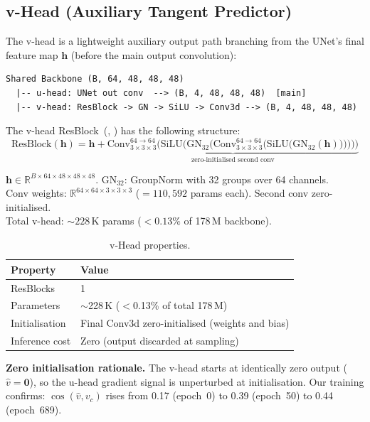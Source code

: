 \subsection{v-Head (Auxiliary Tangent Predictor)}
\label{sec:vhead_arch}

The v-head is a lightweight auxiliary output path branching from the UNet's
final feature map $\mathbf{h}$ (before the main output convolution):
\begin{center}
\begin{BVerbatim}
Shared Backbone (B, 64, 48, 48, 48)
  |-- u-head: UNet out conv  --> (B, 4, 48, 48, 48)  [main]
  |-- v-head: ResBlock -> GN -> SiLU -> Conv3d --> (B, 4, 48, 48, 48)
\end{BVerbatim}
\end{center}

The v-head ResBlock~(, )
has the following structure:
\begin{equation}
  \mathrm{ResBlock}(\mathbf{h})
    = \mathbf{h}
      + \underbrace{
          \mathrm{Conv}_{3 \times 3 \times 3}^{64 \to 64}\bigl(
            \mathrm{SiLU}\bigl(
              \mathrm{GN}_{32}\bigl(
                \mathrm{Conv}_{3 \times 3 \times 3}^{64 \to 64}\bigl(
                  \mathrm{SiLU}\bigl(\mathrm{GN}_{32}(\mathbf{h})\bigr)
                \bigr)
              \bigr)
            \bigr)
          \bigr)
        }_{\text{zero-initialised second conv}}
  \label{eq:vhead_resblock}
\end{equation}
\begin{shapes}
$\mathbf{h} \in \mathbb{R}^{B \times 64 \times 48 \times 48 \times 48}$.
\quad $\mathrm{GN}_{32}$: GroupNorm with 32 groups over 64 channels.\\
Conv weights: $\mathbb{R}^{64 \times 64 \times 3 \times 3 \times 3}$
($= 110{,}592$ params each). Second conv zero-initialised.\\
Total v-head: ${\sim}228$\,K params ($<0.13\%$ of 178\,M backbone).
\end{shapes}

\begin{table}[ht]
\centering
\caption{v-Head properties.}
\label{tab:vhead}
\begin{tabular}{ll}
\toprule
\textbf{Property}   & \textbf{Value} \\
\midrule
ResBlocks            & 1 \\
Parameters           & ${\sim}$228\,K ($<$0.13\% of total 178\,M) \\
Initialisation       & Final Conv3d zero-initialised (weights and bias) \\
Inference cost       & Zero (output discarded at sampling) \\
\bottomrule
\end{tabular}
\end{table}

\textbf{Zero initialisation rationale.}  The v-head starts at identically zero
output ($\hat{v} = \mathbf{0}$), so the u-head gradient signal is unperturbed
at initialisation.  Our training confirms:
$\cos(\hat{v},v_c)$ rises from 0.17 (epoch~0) to 0.39 (epoch~50) to 0.44
(epoch~689).
